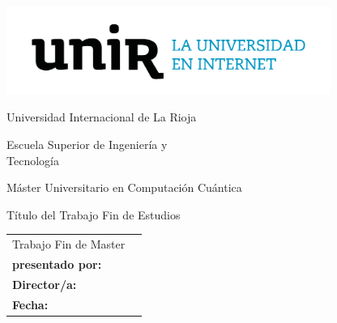 \begin{center}
	\includegraphics[width=10.6cm,height=2.88cm]{logo}

	\Huge Universidad Internacional de La Rioja

	\huge Escuela Superior de Ingeniería y \\ Tecnología

	\vspace{100pt}

	\LARGE Máster Universitario en Computación Cuántica

	\Huge \textcolor{unir-azul-fuerte}{Título del Trabajo Fin de Estudios}
	\normalsize

	\vspace{100pt}

\end{center}
\begin{tabular}{ll}
	Trabajo Fin de Master & \\
	\textbf{presentado por:} & \\
	\textbf{Director/a:}                            & \\
	\textbf{Fecha:}                                 & \\
\end{tabular}